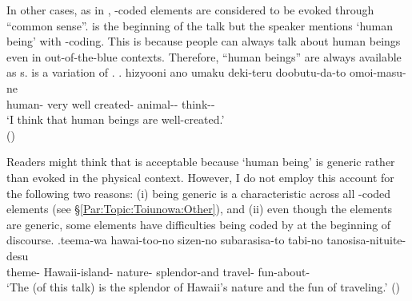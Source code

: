 In other cases, as in \Next,
-coded elements are considered to be evoked through ``common sense''.
\Next is the beginning of the talk
but the speaker mentions  `human being' with -coding.
This is because
people can always talk about human beings even in out-of-the-blue contexts.
Therefore, ``human beings'' are always available as s.
 is a variation of .
%
\exg.\label{ExNingenToiunowa} hizyooni ano umaku deki-teru doobutu-da-to omoi-masu-ne \\
	human- very  well created- animal-- think-- \\
	`I think that human beings are well-created.' \\
 \hfill{()}
%

Readers might think that \Last is acceptable because `human being' is generic rather than evoked in the physical context.
However, I do not employ this account for the following two reasons:
(i) being generic is a characteristic across all -coded elements (see \S \ref{Par:Topic:Toiunowa:Other}), and
(ii) even though the elements are generic, some elements have difficulties being coded by  at the beginning of discourse.
%
\exg.\label{Par:Toiunowa:Ex:Hawaii}teema-wa hawai-too-no sizen-no subarasisa-to tabi-no tanosisa-nituite-desu \\
   theme- Hawaii-island- nature- splendor-and travel- fun-about- \\
   `The  (of this talk) is the splendor of Hawaii's nature and the fun of traveling.'
 \hfill{()}

